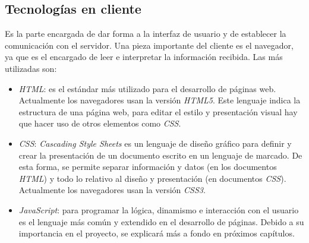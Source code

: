 \subsection{Tecnologías en cliente}
\label{subsec:tecclient}
Es la parte encargada de dar forma a la interfaz de usuario y de establecer la comunicación con el servidor. Una pieza importante del cliente es el navegador, ya que es el encargado de leer e interpretar la información recibida. Las más utilizadas son: 
\begin{itemize}
    \item \textit{HTML}: es el estándar más utilizado para el desarrollo de páginas web. Actualmente los navegadores usan la versión \textit{HTML5}. Este lenguaje indica la estructura de una página web, para editar el estilo y presentación visual hay que hacer uso de otros elementos como \textit{CSS}.
    \item \textit{CSS}: \textit{Cascading Style Sheets} es un lenguaje de diseño gráfico para definir y crear la presentación de un documento escrito en un lenguaje de marcado. De esta forma, se permite separar información y datos (en los documentos \textit{HTML}) y todo lo relativo al diseño y presentación (en documentos \textit{CSS}). Actualmente los navegadores usan la versión \textit{CSS3}.
    \item \textit{JavaScript}: para programar la lógica, dinamismo e interacción con el usuario es el lenguaje más común y extendido en el desarrollo de páginas. Debido a su importancia en el proyecto, se explicará más a fondo en próximos capítulos. 
\end{itemize}

